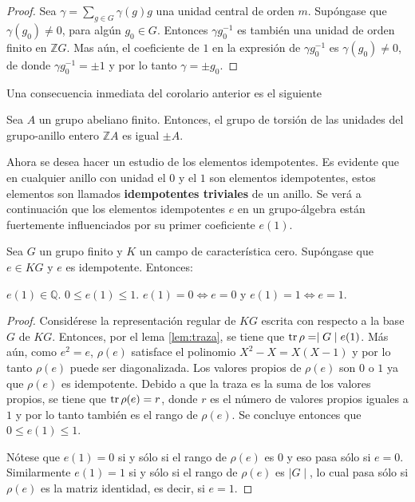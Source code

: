 \begin{proof}
Sea $\gamma = \sum_{g \in G}\gamma(g)g$ una unidad central de orden $m$. Supóngase que $\gamma(g_0) \neq 0$, para algún $g_0 \in G$. Entonces $\gamma g_0^{-1}$ es también una unidad de orden finito en $\mathds{Z}G$. Mas aún, el coeficiente de $1$ en la expresión de $\gamma g_0^{-1}$ es $\gamma(g_0) \neq 0$, de donde $\gamma g_0^{-1} = \pm 1$ y por lo tanto $\gamma = \pm g_0$.
\end{proof}
Una consecuencia inmediata del corolario anterior es el siguiente
\begin{teorema}\label{teo:Graham-Higman}
Sea $A$ un grupo abeliano finito. Entonces, el grupo de torsión de las unidades del grupo-anillo entero $\mathds{Z}A$ es igual $\pm A$.
\end{teorema}

Ahora se desea hacer un estudio de los elementos idempotentes. Es evidente que en cualquier anillo con unidad el $0$ y el $1$ son elementos idempotentes, estos elementos son llamados \textbf{idempotentes triviales} de un anillo. Se verá a continuación que los elementos idempotentes $e$ en un grupo-álgebra están fuertemente influenciados por su primer coeficiente $e(1)$.

\begin{teorema}\label{teo:idme}
Sea $G$ un grupo finito y $K$ un campo de característica cero. Supóngase que $e \in KG$ y $e$ es idempotente. Entonces:
\begin{bulletList}
\newItem $e(1) \in \mathds{Q}$.
\newItem $0 \leq e(1) \leq 1$.
\newItem $e(1) = 0 \Leftrightarrow e = 0$ y $e(1) = 1 \Leftrightarrow e=1$.   
\end{bulletList} 
\end{teorema}
\begin{proof}
Considérese la representación regular de $KG$ escrita con respecto a la base $G$ de $KG$. Entonces, por el lema \ref{lem:traza}, se tiene que $\operatorname{tr}\rho = \mid G \mid e(1)$. Más aún, como $e^2 = e$, $\rho(e)$ satisface el polinomio $X^2 - X = X(X-1)$ y por lo tanto $\rho(e)$ puede ser diagonalizada. Los valores propios de $\rho(e)$ son $0$ o $1$ ya que $\rho(e)$ es idempotente. Debido a que la traza es la suma de los valores propios, se tiene que $\operatorname{tr}\rho(e) = r$, donde $r$ es el número de valores propios iguales a $1$ y por lo tanto también es el rango de $\rho(e)$. Se concluye entonces que $0\leq e(1) \leq 1$.

Nótese que $e(1) = 0 $ si y sólo si el rango de $\rho(e)$ es $0$ y eso pasa sólo si $e = 0$. Similarmente $e(1) = 1$ si y sólo si el rango de $\rho(e)$ es $\mid G \mid $, lo cual pasa sólo si $\rho(e)$ es la matriz identidad, es decir, si $e = 1$. 
\end{proof} 
